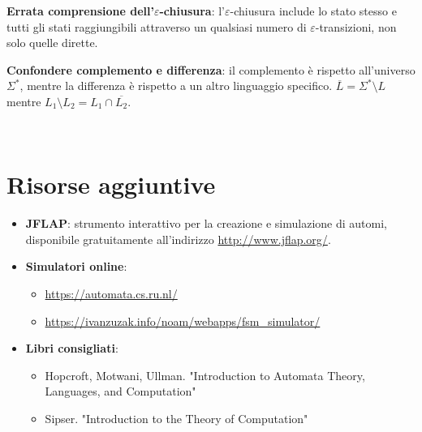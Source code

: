 \documentclass[12pt,a4paper]{article}
\begin{document}
\begin{errorecomune}
\textbf{Errata comprensione dell'$\varepsilon$-chiusura}: l'$\varepsilon$-chiusura include lo stato stesso e tutti gli stati raggiungibili attraverso un qualsiasi numero di $\varepsilon$-transizioni, non solo quelle dirette.
\end{errorecomune}

\begin{errorecomune}
\textbf{Confondere complemento e differenza}: il complemento è rispetto all'universo $\Sigma^*$, mentre la differenza è rispetto a un altro linguaggio specifico. $\overline{L} = \Sigma^* \setminus L$ mentre $L_1 \setminus L_2 = L_1 \cap \overline{L_2}$.
\end{errorecomune}

\
\section{Risorse aggiuntive}

\begin{itemize}
  \item \textbf{JFLAP}: strumento interattivo per la creazione e simulazione di automi, disponibile gratuitamente all'indirizzo \url{http://www.jflap.org/}.
  
  \item \textbf{Simulatori online}:
  \begin{itemize}
    \item \url{https://automata.cs.ru.nl/}
    \item \url{https://ivanzuzak.info/noam/webapps/fsm_simulator/}
  \end{itemize}
  
  \item \textbf{Libri consigliati}:
  \begin{itemize}
    \item Hopcroft, Motwani, Ullman. "Introduction to Automata Theory, Languages, and Computation"
    \item Sipser. "Introduction to the Theory of Computation"
  \end{itemize}
\end{itemize}
\end{document}
